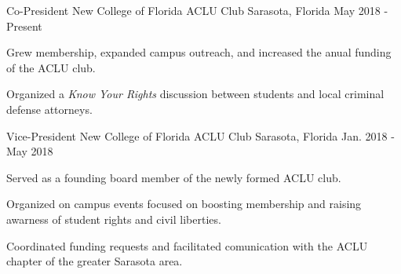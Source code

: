 

\begin{cventries}


  \cventry
    {Co-President} %
    {New College of Florida ACLU Club} %
    {Sarasota, Florida} %
    {May 2018 - Present} %
    {
      \begin{cvitems} %
        \item {Grew membership, expanded campus outreach, and increased the anual funding of the ACLU club.}
        \item {Organized a \emph{Know Your Rights} discussion between students and local criminal defense attorneys.}
      \end{cvitems}
    }

  \cventry
    {Vice-President} %
    {New College of Florida ACLU Club} %
    {Sarasota, Florida} %
    {Jan. 2018 - May 2018} %
    {
      \begin{cvitems} %
        \item {Served as a founding board member of the newly formed ACLU club.}
        \item {Organized on campus events focused on boosting membership and raising awarness of student rights and civil liberties.}
        \item {Coordinated funding requests and facilitated comunication with the ACLU chapter of the greater Sarasota area.}
      \end{cvitems}
    }

\end{cventries}
